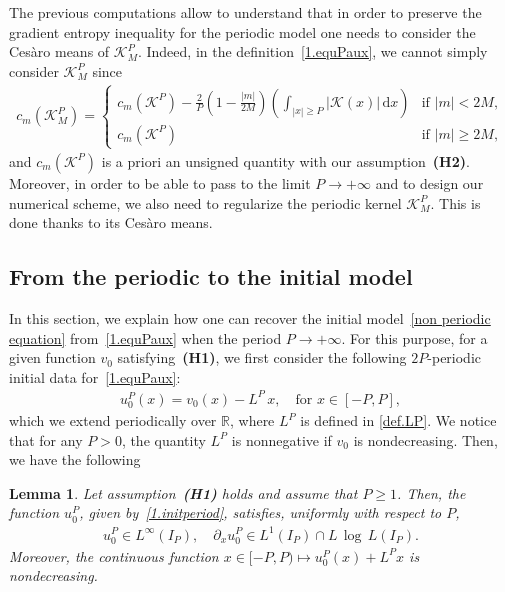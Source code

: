 \documentclass[11pt]{amsart}
\newtheorem{lemma}{Lemma}
\newcommand{\K}{\mathcal{K}}
\newcommand{\dd}{\mathrm{d}}
\newcommand{\pa}{\partial}
\newcommand{\R}{\mathbb{R}}
\begin{document}
The previous computations allow to understand that in order to preserve the gradient entropy inequality for the periodic model one needs to consider the Ces\`aro means of $\K^P_M$. Indeed, in the definition~\eqref{1.equPaux}, we cannot simply consider $\K^P_M$ since
\begin{align*}
    c_m(\K^P_M) =
        \left\{
    \begin{array}{ll}
        c_m(\K^P) - \frac{2}{P}\left(1-\frac{|m|}{2M}\right)\left(\displaystyle\int_{|x|\geq P} |\K(x)|\,\dd x\right) & \mbox{if } |m|< 2M, \\
        c_m(\K^P) & \mbox{if } |m|\geq 2M,
    \end{array}
    \right.
\end{align*}
and $c_m(\K^P)$ is a priori an unsigned quantity with our assumption~\textbf{(H2)}. Moreover, in order to be able to pass to the limit $P\to +\infty$ and to design our numerical scheme, we also need to regularize the periodic kernel $\K^P_M$. This is done thanks to its Ces\`aro means.

\subsection{From the periodic to the initial model}\label{sec.fromperiodic.to.init}

In this section, we explain how one can recover the initial model~\eqref{non periodic equation} from~\eqref{1.equPaux} when the period $P \to +\infty$. For this purpose, for a given function $v_0$ satisfying~\textbf{(H1)}, we first consider the following $2P$-periodic initial data for~\eqref{1.equPaux}:
\begin{align}\label{1.initperiod}
    u^P_0(x) = v_0(x) - L^P \, x, \quad \mbox{for } x \in [-P,P],
\end{align}
which we extend periodically over $\R$, where $L^P$ is defined in  \eqref{def.LP}. 
We notice that for any $P>0$, the quantity $L^P$ is nonnegative if $v_0$ is nondecreasing. Then, we have the following

\begin{lemma}\label{lem.init.perio.to.nonperiod}
Let assumption~\textbf{\emph{(H1)}} holds and assume that $P\ge 1$. Then, the function $u^P_0$, given by~\eqref{1.initperiod}, satisfies, uniformly with respect to $P$,
\begin{align*}
    u^P_0 \in L^\infty(I_P), \quad \pa_x u^P_0 \in L^1(I_P)\cap L\,\log \,L(I_P).
\end{align*}    
Moreover, the continuous function $x \in [-P,P)  \mapsto u^P_0(x) + L^Px$ is nondecreasing.
\end{lemma}
\end{document}
